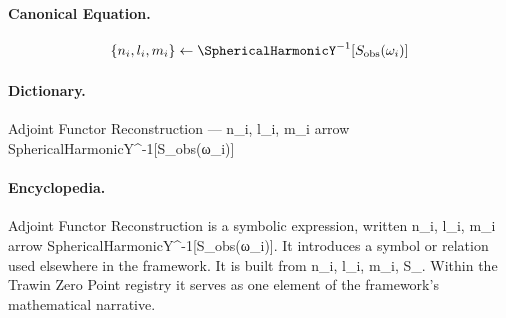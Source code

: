 \paragraph{Canonical Equation.}
\[
\{n_i, l_i, m_i\} \leftarrow \SphericalHarmonicY^{-1}[S_{\text{obs}}(\omega_i)]
\]

\paragraph{Dictionary.}
Adjoint Functor Reconstruction — n\_i, l\_i, m\_i arrow SphericalHarmonicY\textasciicircum{}-1[S\_obs(ω\_i)]

\paragraph{Encyclopedia.}
Adjoint Functor Reconstruction is a symbolic expression, written n\_i, l\_i, m\_i arrow SphericalHarmonicY\textasciicircum{}-1[S\_obs(ω\_i)]. It introduces a symbol or relation used elsewhere in the framework. It is built from n\_i, l\_i, m\_i, S\_. Within the Trawin Zero Point registry it serves as one element of the framework's mathematical narrative.
